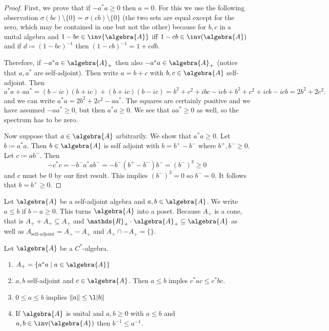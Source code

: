 \documentclass[a4paper]{article}
\begin{document}
\begin{proof}
	First, we prove that if $ - a^* a \geq 0$ then $a = 0$.
	For this we use the following observation $\sigma(bc) \setminus \{0\} = \sigma(cb) \setminus \{0\}$ (the two sets are equal except for the zero, which may be contained in one but not the other) because for $b,c$ in a unital algebra and $1 - bc \in \inv{\algebra{A}}$ iff $1 - cb \in \inv(\algebra{A})$ and if $d \coloneq (1 - bc)^{-1}$ then $(1 - cb)^{-1} = 1 + cdb$.

	Therefore, if $-a^* a \in \algebra{A}_+$ then also $- a^* a \in \algebra{A}_+$ (notice that $a, a^*$ are self-adjoint).
	Then write $a = b + c$ with $b,c \in \algebra{A}$ self-adjoint. Then
	\begin{equation*}
		a^* a + a a^*  = (b - ic) (b + ic) + (b + ic) (b-ic) = b^2 + c^2 + ibc - icb + b^2 + c^2 + icb - icb = 2b^2 + 2c^2 \text{.}
	\end{equation*}
	and we can write $a^* a = 2b^2 + 2c^2 - a a ^*$.
	The squares are certainly positive and we have assumed $-a a^* \geq 0$, but then $a^* a \geq 0$.
	We see that $a a^* \geq 0$ as well, so the spectrum has to be zero. 

	Now suppose that $a \in \algebra{A}$ arbitrarily. We show that $a^* a \geq 0$. Let $b \coloneq a^* a$.
	Then $b \in \algebra{A}$ is self adjoint with $b = b^+ - b^-$ where $b^+ , b^- \geq 0$.
	Let $c \coloneq a b^-$. Then
	\begin{equation*}
		- c^* c = - b^- a^* a b^- = - b^- (b^+ - b^-) b^- = (b^-)^3 \geq 0
	\end{equation*}
	and $c$ must be $0$ by our first result.
	This implies $(b^-)^3 = 0$ so $b^- = 0$.
	It follows that $b = b^+ \geq 0$.
\end{proof}

\begin{definition}
	Let $\algebra{A}$ be a self-adjoint algebra and $a,b \in \algebra{A}$. We write $a \leq b$ if $b- a \geq 0$.
	This turns $\algebra{A}$ into a poset.
	Because $A_+$ is a cone, that is $A_+ + A_+ \subseteq A_+$ and $\mathds{R}_+ \cdot \algebra{A}_+ \subseteq \algebra{A}$ as well as $A_{\text{self-adjoint}} = A_+ - A_+$ and $A_+ \cap -A_+ = \{\}$.
\end{definition}

\begin{theorem}
	Let $\algebra{A}$ be a $C^*$-algebra.
	\begin{enumerate}
		\item $A_+ = \{a^* a \mid a \in \algebra{A}\}$
		\item $a,b$ self-adjoint and $c \in \algebra{A}$. Then $a \leq b$ imples $c^* a c \leq c^* b c$.
		\item $0 \leq a \leq b$ implies $\|a\| \leq \l|b\|$
		\item If $\algebra{A}$ is unital and $a,b \geq 0$ with $a \leq b$ and $a,b \in \inv(\algebra{A})$ then $b^{-1} \leq a^{-1}$.
	\end{enumerate}
\end{theorem}
\end{document}
